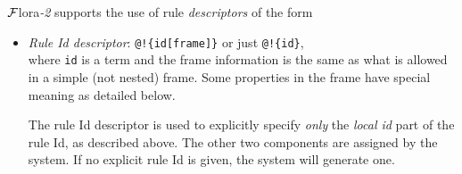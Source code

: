 \documentclass[11pt]{article}
\newcommand{\FLSYSTEM}{{\mbox{\sc ${\cal F}${lora}\rm\emph{-2}}}\xspace}
\begin{document}
\FLSYSTEM supports the use of rule \emph{descriptors} of the form
\begin{itemize}
\item  \emph{Rule Id descriptor}:   \texttt{@!\{id[frame]\}}  or just \texttt{@!\{id\}}, \\
  where \texttt{id} is a term and the frame information is the same as what
  is allowed in a simple (not nested) frame.
  Some properties in the frame have special meaning as detailed below.

  The rule Id descriptor is used to explicitly specify \emph{only}
  the \emph{local id}
  part of the rule Id, as described above. The other two components
  are assigned by the system. If no explicit rule Id is given, the system
  will generate one.


\end{itemize}
\end{document}
